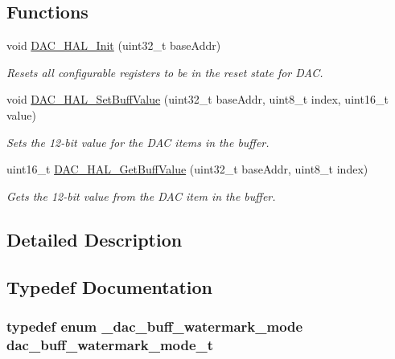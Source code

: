 \subsection*{Functions}
\begin{DoxyCompactItemize}
\item 
void \hyperlink{group__dac__hal_gabe73f0941f304edc1cb819a88531a786}{D\+A\+C\+\_\+\+H\+A\+L\+\_\+\+Init} (uint32\+\_\+t base\+Addr)
\begin{DoxyCompactList}\small\item\em Resets all configurable registers to be in the reset state for D\+AC. \end{DoxyCompactList}\item 
void \hyperlink{group__dac__hal_ga3fc9b24421da155a29adac5fa58c2010}{D\+A\+C\+\_\+\+H\+A\+L\+\_\+\+Set\+Buff\+Value} (uint32\+\_\+t base\+Addr, uint8\+\_\+t index, uint16\+\_\+t value)
\begin{DoxyCompactList}\small\item\em Sets the 12-\/bit value for the D\+AC items in the buffer. \end{DoxyCompactList}\item 
uint16\+\_\+t \hyperlink{group__dac__hal_ga4ee9b4cc5f089627de7b3388216b3a92}{D\+A\+C\+\_\+\+H\+A\+L\+\_\+\+Get\+Buff\+Value} (uint32\+\_\+t base\+Addr, uint8\+\_\+t index)
\begin{DoxyCompactList}\small\item\em Gets the 12-\/bit value from the D\+AC item in the buffer. \end{DoxyCompactList}\end{DoxyCompactItemize}


\subsection{Detailed Description}


\subsection{Typedef Documentation}
\subsubsection[{\texorpdfstring{dac\+\_\+buff\+\_\+watermark\+\_\+mode\+\_\+t}{dac_buff_watermark_mode_t}}]{\setlength{\rightskip}{0pt plus 5cm}typedef enum {\bf \+\_\+dac\+\_\+buff\+\_\+watermark\+\_\+mode}  {\bf dac\+\_\+buff\+\_\+watermark\+\_\+mode\+\_\+t}}\hypertarget{group__dac__hal_ga31cd37ee3901ceda4014e7c5301a8ea1}{}\label{group__dac__hal_ga31cd37ee3901ceda4014e7c5301a8ea1}


